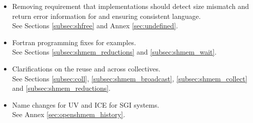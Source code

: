 \begin{itemize}
\item Removing requirement that implementations should detect size mismatch and return error information for  and ensuring consistent language.\\See Sections \ref{subsec:shfree} and Annex \ref{sec:undefined}. 
\item Fortran programming fixes for examples.\\ See Sections \ref{subsec:shmem_reductions} and \ref{subsec:shmem_wait}. 
\item Clarifications on the reuse  and  across collectives.\\See Sections \ref{subsec:coll}, \ref{subsec:shmem_broadcast}, \ref{subsec:shmem_collect} and \ref{subsec:shmem_reductions}.
\item Name changes for UV and ICE for SGI systems.\\See Annex \ref{sec:openshmem_history}. \cbend 
\end{itemize}
